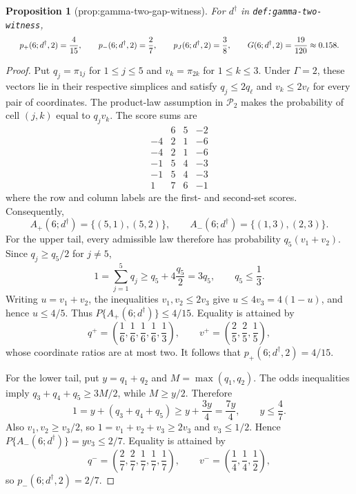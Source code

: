 \documentclass{article}
\newtheorem{proposition}{Proposition}
\begin{document}
\begin{proposition}[prop:gamma-two-gap-witness]\label{prop:gamma-two-gap-witness}
For \(d^\dagger\) in \texttt{def:gamma-two-witness}, \[
\makebox[\linewidth][c]{\resizebox{0.98\linewidth}{!}{\par\noindent \makebox[\linewidth][c]{\resizebox{0.98\linewidth}{!}{\(\displaystyle \displaystyle p_+(6;d^\dagger,2)=\frac{4}{15},\qquad p_-(6;d^\dagger,2)=\frac{2}{7},\qquad p_J(6;d^\dagger,2)=\frac{3}{8},\qquad G(6;d^\dagger,2)=\frac{19}{120}\approx0.158.\)}}\par\noindent}}
\]
\end{proposition}
\begin{proof}
Put \(q_j=\pi_{1j}\) for \(1\le j\le5\) and \(v_k=\pi_{2k}\) for \(1\le k\le3\). Under \(\Gamma=2\), these vectors lie in their respective simplices and satisfy \(q_j\le2q_\ell\) and \(v_k\le2v_\ell\) for every pair of coordinates. The product-law assumption in \(\mathcal P_2\) makes the probability of cell \((j,k)\) equal to \(q_jv_k\). The score sums are
\[\begin{array}{c|ccc} &6&5&-2\\ \hline -4&2&1&-6\\ -4&2&1&-6\\ -1&5&4&-3\\ -1&5&4&-3\\ 1&7&6&-1 \end{array}\]
where the row and column labels are the first- and second-set scores. Consequently,
\[A_+(6;d^\dagger)=\{(5,1),(5,2)\},\qquad A_-(6;d^\dagger)=\{(1,3),(2,3)\}.\]
For the upper tail, every admissible law therefore has probability \(q_5(v_1+v_2)\). Since \(q_j\ge q_5/2\) for \(j\ne5\),
\[1=\sum_{j=1}^5q_j\ge q_5+4\frac{q_5}{2}=3q_5,\qquad q_5\le\frac13.\]
Writing \(u=v_1+v_2\), the inequalities \(v_1,v_2\le2v_3\) give \(u\le4v_3=4(1-u)\), and hence \(u\le4/5\). Thus \(P\{A_+(6;d^\dagger)\}\le4/15\). Equality is attained by
\[q^+=\left(\frac16,\frac16,\frac16,\frac16,\frac13\right),\qquad v^+=\left(\frac25,\frac25,\frac15\right),\]
whose coordinate ratios are at most two. It follows that \(p_+(6;d^\dagger,2)=4/15\).

For the lower tail, put \(y=q_1+q_2\) and \(M=\max(q_1,q_2)\). The odds inequalities imply \(q_3+q_4+q_5\ge3M/2\), while \(M\ge y/2\). Therefore
\[1=y+(q_3+q_4+q_5)\ge y+\frac{3y}{4}=\frac{7y}{4},\qquad y\le\frac47.\]
Also \(v_1,v_2\ge v_3/2\), so \(1=v_1+v_2+v_3\ge2v_3\) and \(v_3\le1/2\). Hence \(P\{A_-(6;d^\dagger)\}=yv_3\le2/7\). Equality is attained by
\[q^-=\left(\frac27,\frac27,\frac17,\frac17,\frac17\right),\qquad v^-=\left(\frac14,\frac14,\frac12\right),\]
so \(p_-(6;d^\dagger,2)=2/7\).


\end{proof}
\end{document}
